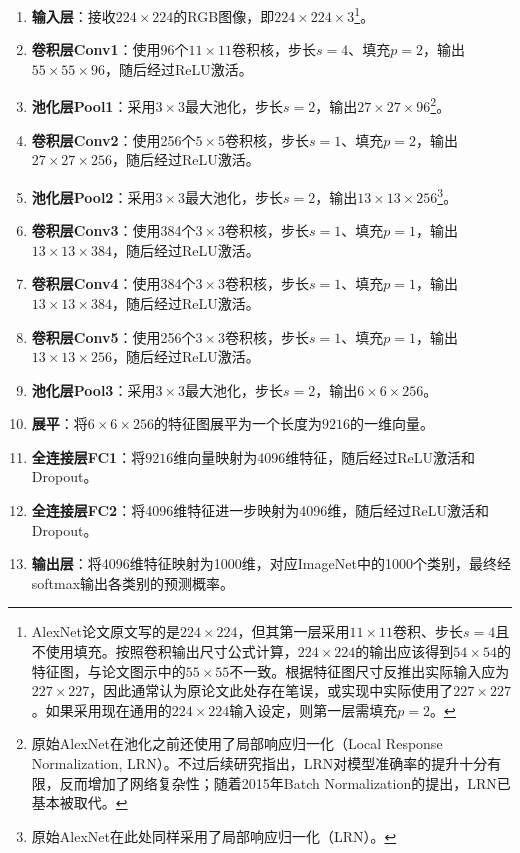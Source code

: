 \begin{enumerate}
    \item \textbf{输入层}：接收$224\times224$的RGB图像，即$224\times224\times3$\footnote{AlexNet论文原文写的是$224\times224$，但其第一层采用$11\times11$卷积、步长$s=4$且不使用填充。按照卷积输出尺寸公式计算，$224\times224$的输出应该得到$54\times54$的特征图，与论文图示中的$55\times55$不一致。根据特征图尺寸反推出实际输入应为$227\times227$，因此通常认为原论文此处存在笔误，或实现中实际使用了$227\times227$。如果采用现在通用的$224\times224$输入设定，则第一层需填充$p=2$。}。
    \item \textbf{卷积层Conv1}：使用96个$11\times11$卷积核，步长$s=4$、填充$p=2$，输出$55\times55\times96$，随后经过ReLU激活。
    \item \textbf{池化层Pool1}：采用$3\times3$最大池化，步长$s=2$，输出$27\times27\times96$\footnote{原始AlexNet在池化之前还使用了局部响应归一化（Local Response Normalization, LRN）。不过后续研究指出，LRN对模型准确率的提升十分有限，反而增加了网络复杂性；随着2015年Batch Normalization的提出，LRN已基本被取代。}。
    \item \textbf{卷积层Conv2}：使用256个$5\times5$卷积核，步长$s=1$、填充$p=2$，输出$27\times27\times256$，随后经过ReLU激活。
    \item \textbf{池化层Pool2}：采用$3\times3$最大池化，步长$s=2$，输出$13\times13\times256$\footnote{原始AlexNet在此处同样采用了局部响应归一化（LRN）。}。
    \item \textbf{卷积层Conv3}：使用384个$3\times3$卷积核，步长$s=1$、填充$p=1$，输出$13\times13\times384$，随后经过ReLU激活。
    \item \textbf{卷积层Conv4}：使用384个$3\times3$卷积核，步长$s=1$、填充$p=1$，输出$13\times13\times384$，随后经过ReLU激活。
    \item \textbf{卷积层Conv5}：使用256个$3\times3$卷积核，步长$s=1$、填充$p=1$，输出$13\times13\times256$，随后经过ReLU激活。
    \item \textbf{池化层Pool3}：采用$3\times3$最大池化，步长$s=2$，输出$6\times6\times256$。
    \item \textbf{展平}：将$6\times6\times256$的特征图展平为一个长度为$9216$的一维向量。
    \item \textbf{全连接层FC1}：将$9216$维向量映射为4096维特征，随后经过ReLU激活和Dropout。
    \item \textbf{全连接层FC2}：将4096维特征进一步映射为4096维，随后经过ReLU激活和Dropout。
    \item \textbf{输出层}：将4096维特征映射为1000维，对应ImageNet中的1000个类别，最终经softmax输出各类别的预测概率。
\end{enumerate}


